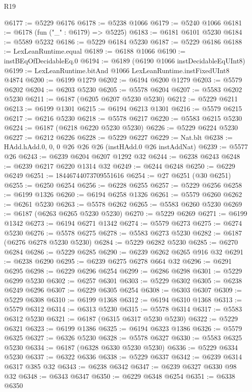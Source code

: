 \begin{lexlean}{R19}
\begin{coremodule}
@6177 := @5229 @6176
@6178 := @5238 @1066
@6179 := @5240 @1066
@6181 := @6178 (fun ("_" : @6179) => @5225)
@6183 := @6181 @6101 @5230
@6184 := @5589 @5232
@6186 := @5229 @6184 @5230
@6187 := @5229 @6186
@6188 := LexLeanRuntime.equal
@6189 := @6188 @1066
@6190 := instBEqOfDecidableEq.{0}
@6194 := @6189 (@6190 @1066 instDecidableEqUInt8)
@6199 := LexLeanRuntime.bitAnd @1066 LexLeanRuntime.instFixedUInt8 @4874
@6200 := @6199 @1279
@6202 := @6194 @6200 @1279
@6203 := @5579 @6202
@6204 := @6203 @5230
@6205 := @5578 @6204
@6207 := @5583 @6202 @5230
@6211 := @6187 (@6205 @6207 @5230 @5230)
@6212 := @5229 @6211
@6213 := @6199 @1301
@6215 := @6194 @6213 @1301
@6216 := @5579 @6215
@6217 := @6216 @5230
@6218 := @5578 @6217
@6220 := @5583 @6215 @5230
@6224 := @6187 (@6218 @6220 @5230 @5230)
@6226 := @5229 @6224 @5230
@6227 := @6212 @6226
@6228 := @5229 @6227
@6229 := Nat.blt
@6238 := HAdd.hAdd.{0, 0, 0} @26 @26 @26 (instHAdd.{0} @26 instAddNat)
@6239 := @5577 @26
@6243 := @6239 @6204 @6207 @1292 @32
@6244 := @6238 @6243
@6248 := @6239 @6217 @6220 @1314 @32
@6249 := @6244 @6248
@6250 := @6229 @6249
@6251 := 18446744073709551616
@6254 := @27 @6251 (@30 @6251)
@6255 := @6250 @6254
@6256 := @6228 @6255
@6257 := @5229 @6256
@6258 := @6199 @1326
@6260 := @6194 @6258 @1326
@6261 := @5579 @6260
@6262 := @6261 @5230
@6263 := @5578 @6262
@6265 := @5583 @6260 @5230
@6269 := @6187 (@6263 @6265 @5230 @5230)
@6270 := @5229 @6269
@6271 := @6199 @1342
@6273 := @6194 @6271 @1342
@6274 := @5579 @6273
@6275 := @6274 @5230
@6276 := @5578 @6275
@6278 := @5583 @6273 @5230
@6282 := @6187 (@6276 @6278 @5230 @5230)
@6284 := @5229 @6282 @5230
@6285 := @6270 @6284
@6286 := @5229 @6285
@6290 := @6239 @6262 @6265 @916 @32
@6291 := @6238 @6290
@6295 := @6239 @6275 @6278 @664 @32
@6296 := @6291 @6295
@6298 := @6229 @6296 @6254
@6299 := @6286 @6298
@6301 := @5229 @6299 @5230
@6302 := @6257 @6301
@6303 := @5229 @6302
@6305 := @6238 @6249 @6296
@6307 := @6229 @6305 @6254
@6308 := @6303 @6307
@6309 := @5229 @6308
@6310 := @6199 @1368
@6312 := @6194 @6310 @1368
@6313 := @5579 @6312
@6314 := @6313 @5230
@6315 := @5578 @6314
@6317 := @5583 @6312 @5230
@6321 := @6187 (@6315 @6317 @5230 @5230)
@6322 := @5229 @6321
@6323 := @6199 @1386
@6325 := @6194 @6323 @1386
@6326 := @5579 @6325
@6327 := @6326 @5230
@6328 := @5578 @6327
@6330 := @5583 @6325 @5230
@6334 := @6187 (@6328 @6330 @5230 @5230)
@6336 := @5229 @6334 @5230
@6337 := @6322 @6336
@6338 := @5229 @6337
@6342 := @6239 @6314 @6317 @385 @32
@6343 := @6238 @6342
@6347 := @6239 @6327 @6330 @98 @32
@6348 := @6343 @6347
@6350 := @6229 @6348 @6254
@6351 := @6338 @6350

\end{coremodule}
\end{lexlean}
